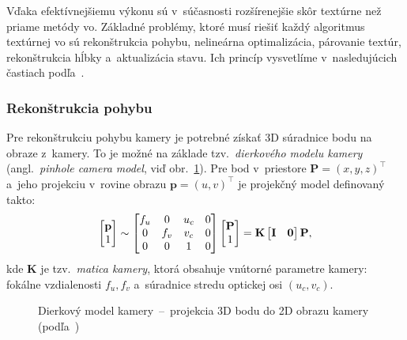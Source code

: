     Vďaka efektívnejšiemu výkonu sú v~súčasnosti rozšírenejšie skôr textúrne než priame metódy \acrshort{vo}. Základné problémy, ktoré musí riešiť každý algoritmus textúrnej \acrshort{vo} sú rekonštrukcia pohybu, nelineárna optimalizácia, párovanie textúr, rekonštrukcia hĺbky a~aktualizácia stavu. Ich princíp vysvetlíme v~nasledujúcich častiach podľa~\cite{chienWhenUseWhat2016}.
    
    \subsubsection{Rekonštrukcia pohybu}

      Pre rekonštrukciu pohybu kamery je potrebné získať 3D súradnice bodu na obraze z~kamery. To je možné na základe tzv.\ \emph{dierkového modelu kamery} (angl.\ \emph{pinhole camera model}, viď obr.~\ref{fig:pinhole}). Pre bod v~priestore $\mathbf P = {(x,y,z)}^{\top}$ a~jeho projekciu v~rovine obrazu $\mathbf p = {(u,v)}^{\top}$ je projekčný model definovaný takto:
      \begin{equation}
        \begin{bmatrix}
            \bf p \\ 1
        \end{bmatrix}
        \sim
        \begin{bmatrix}
            f_u & 0 & u_c & 0 \\
            0 & f_v & v_c & 0 \\
            0 & 0 & 1 & 0
        \end{bmatrix}
        \begin{bmatrix}
            \bf P \\ 1
        \end{bmatrix}
        =
        \bf K
        \begin{bmatrix}
            \bf I & \bf 0
        \end{bmatrix}
        \bf P,
      \end{equation}
      kde $\mathbf K$ je tzv.\ \emph{matica kamery}, ktorá obsahuje vnútorné parametre kamery: fokálne vzdialenosti $f_u, f_v$ a~súradnice stredu optickej osi $(u_c,v_c)$.

      \begin{figure}[t!]
        \centering
        \resizebox{0.6\textwidth}{!}{}
        \caption[Dierkový model kamery]{Dierkový model kamery~--~projekcia 3D bodu do 2D obrazu kamery (podľa~\cite{CameraCalibration3D})}\label{fig:pinhole}
    \end{figure}
      
